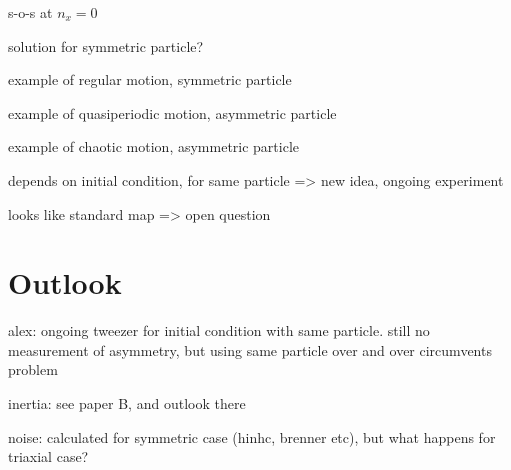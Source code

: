 \documentclass[thesis.tex]{subfiles}
\begin{document}
s-o-s at $n_x=0$ \cite{hinch1979, yarin1997}

solution for symmetric particle?

example of regular motion, symmetric particle

example of quasiperiodic motion, asymmetric particle

example of chaotic motion, asymmetric particle

depends on initial condition, for same particle => new idea, ongoing experiment

looks like standard map => open question

\section{Outlook}

alex: ongoing tweezer for initial condition with same particle. still no measurement of asymmetry, but using same particle over and over circumvents problem

inertia: see paper B, and outlook there

noise: calculated for symmetric case (hinhc, brenner etc), but what happens for triaxial case?
\end{document}
